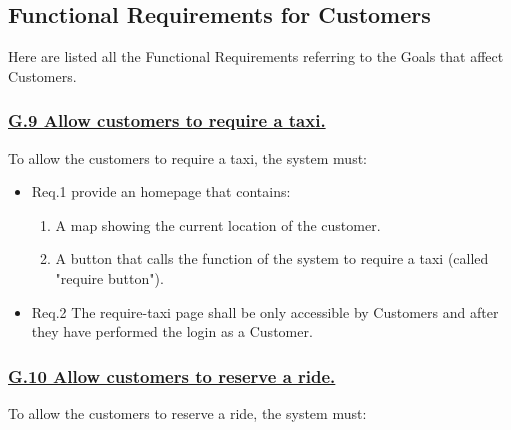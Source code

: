 		\subsection{Functional Requirements for Customers}
		Here are listed all the Functional Requirements referring to the Goals that affect Customers.

			\subsubsection{\lbrack \hyperref[sec:g9]{G.9 Allow customers to require a taxi.}\rbrack}\label{sec:frs9}
			To allow the customers to require a taxi, the system must:

				\begin{itemize}
					\item \lbrack Req.1\rbrack \label{sec:fr1_g9} provide an homepage that contains:
						\begin{enumerate}
							\item A map showing the current location of the customer.
							\item A button that calls the function of the system to require a taxi (called "require button").
						\end{enumerate}
					\item \lbrack Req.2\rbrack \label{sec:fr2_g9} The require-taxi page shall be only accessible by Customers and after they have performed the login as a Customer.
				\end{itemize}

			\subsubsection{\lbrack \hyperref[sec:g10]{G.10 Allow customers to reserve a ride.}\rbrack}\label{sec:frs10}
			To allow the customers to reserve a ride, the system must:

